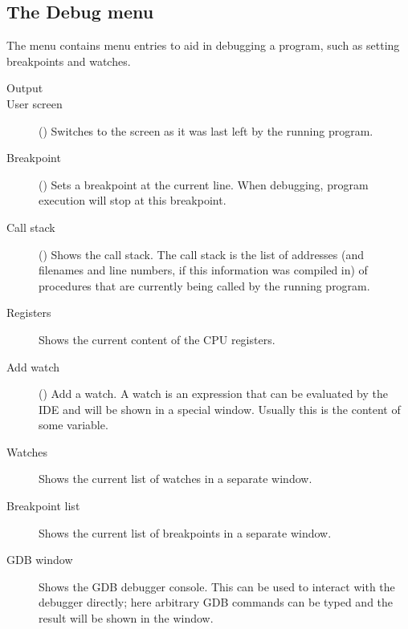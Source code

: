 \subsection{The Debug menu}
\label{se:menudebug}
The  menu contains menu entries to aid in debugging a program, such as
setting breakpoints and watches.
\begin{description}
\item[Output]
\item[User screen] ()
Switches to the screen as it was last left by the running program.
\item[Breakpoint] ()
Sets a breakpoint at the current line. When debugging, program execution
will stop at this breakpoint.
\item[Call stack] ()
Shows the call stack. The call stack is the list of addresses (and
filenames and line numbers, if this information was compiled in) of
procedures that are currently being called by the running program.
\item[Registers]
Shows the current content of the CPU registers.
\item[Add watch] () Add a watch. A watch is an expression
that can be evaluated by the IDE and will be shown in a special window.
Usually this is the content of some variable.
\item[Watches]
Shows the current list of watches in a separate window.
\item[Breakpoint list]
Shows the current list of breakpoints in a separate window.
\item[GDB window]
Shows the GDB debugger console. This can be used to interact with the debugger
directly; here arbitrary GDB commands can be typed and the result will be
shown in the window.
\end{description}
%
%
